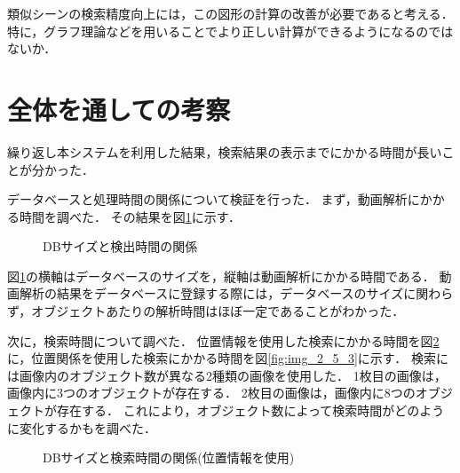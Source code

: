 \documentclass[a4j,12pt,dvipdfmx]{jreport}
\begin{document}
類似シーンの検索精度向上には，この図形の計算の改善が必要であると考える．
特に，グラフ理論などを用いることでより正しい計算ができるようになるのではないか．

\section{全体を通しての考察}\label{chap4-4}

繰り返し本システムを利用した結果，検索結果の表示までにかかる時間が長いことが分かった．

データベースと処理時間の関係について検証を行った．
まず，動画解析にかかる時間を調べた．
その結果を図\ref{fig:img_2_5}に示す．
\begin{figure}[H]
  \centering
  \caption{DBサイズと検出時間の関係}
  \label{fig:img_2_5}
\end{figure}

図\ref{fig:img_2_5}の横軸はデータベースのサイズを，縦軸は動画解析にかかる時間である．
動画解析の結果をデータベースに登録する際には，データベースのサイズに関わらず，オブジェクトあたりの解析時間はほぼ一定であることがわかった．

次に，検索時間について調べた．
位置情報を使用した検索にかかる時間を図\ref{fig:img_2_5_2}に，位置関係を使用した検索にかかる時間を図\ref{fig:img_2_5_3}に示す．
検索には画像内のオブジェクト数が異なる2種類の画像を使用した．
1枚目の画像は，画像内に3つのオブジェクトが存在する．
2枚目の画像は，画像内に8つのオブジェクトが存在する．
これにより，オブジェクト数によって検索時間がどのように変化するかもを調べた．
\begin{figure}[H]
  \centering
  \caption{DBサイズと検索時間の関係(位置情報を使用)}
  \label{fig:img_2_5_2}
\end{figure}
\end{document}
